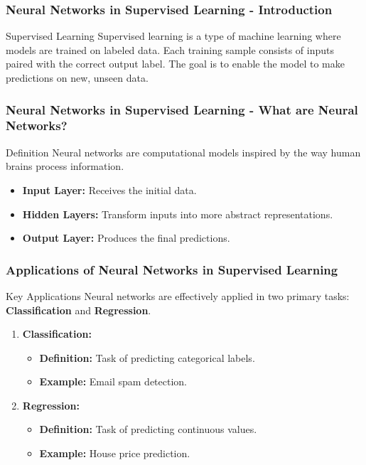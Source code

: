 \documentclass[aspectratio=169]{beamer}
\begin{document}
\begin{frame}[fragile]
    \frametitle{Neural Networks in Supervised Learning - Introduction}
    \begin{block}{Supervised Learning}
        Supervised learning is a type of machine learning where models are trained on labeled data. 
        Each training sample consists of inputs paired with the correct output label. The goal is to enable the model to make predictions on new, unseen data.
    \end{block}
\end{frame}

\begin{frame}[fragile]
    \frametitle{Neural Networks in Supervised Learning - What are Neural Networks?}
    \begin{block}{Definition}
        Neural networks are computational models inspired by the way human brains process information. 
    \end{block}
    
    \begin{itemize}
        \item \textbf{Input Layer:} Receives the initial data.
        \item \textbf{Hidden Layers:} Transform inputs into more abstract representations.
        \item \textbf{Output Layer:} Produces the final predictions.
    \end{itemize}
\end{frame}

\begin{frame}[fragile]
    \frametitle{Applications of Neural Networks in Supervised Learning}
    \begin{block}{Key Applications}
        Neural networks are effectively applied in two primary tasks: \textbf{Classification} and \textbf{Regression}.
    \end{block}

    \begin{enumerate}
        \item \textbf{Classification:}
        \begin{itemize}
            \item \textbf{Definition:} Task of predicting categorical labels.
            \item \textbf{Example:} Email spam detection.
        \end{itemize}

        \item \textbf{Regression:}
        \begin{itemize}
            \item \textbf{Definition:} Task of predicting continuous values.
            \item \textbf{Example:} House price prediction.
        \end{itemize}
    \end{enumerate}
\end{frame}
\end{document}
